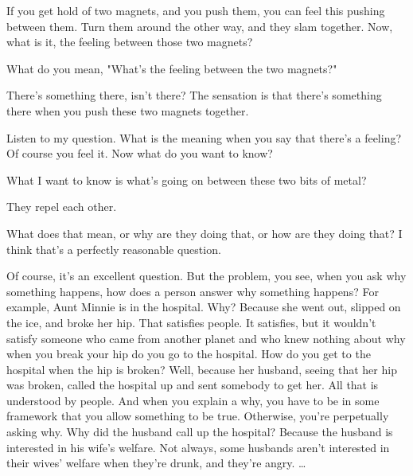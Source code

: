 \begin{description}[leftmargin=0cm, labelsep=0.5cm]
    \item[\textbf{Interviewer:}] If you get hold of two magnets, and you push them, you can feel this pushing between them. Turn them around the other way, and they slam together. Now, what is it, the feeling between those two magnets?

    \item[\textbf{Feynman:}] What do you mean, "What's the feeling between the two magnets?"

    \item[\textbf{Interviewer:}] There's something there, isn't there? The sensation is that there's something there when you push these two magnets together.

    \item[\textbf{Feynman:}] Listen to my question. What is the meaning when you say that there's a feeling? Of course you feel it. Now what do you want to know?

    \item[\textbf{Interviewer:}] What I want to know is what's going on between these two bits of metal?

    \item[\textbf{Feynman:}] They repel each other.

    \item[\textbf{Interviewer:}] What does that mean, or why are they doing that, or how are they doing that? I think that's a perfectly reasonable question.

    \item[\textbf{Feynman:}] Of course, it's an excellent question. But the problem, you see, when you ask why something happens, how does a person answer why something happens? For example, Aunt Minnie is in the hospital. Why? Because she went out, slipped on the ice, and broke her hip. That satisfies people. It satisfies, but it wouldn't satisfy someone who came from another planet and who knew nothing about why when you break your hip do you go to the hospital. How do you get to the hospital when the hip is broken? Well, because her husband, seeing that her hip was broken, called the hospital up and sent somebody to get her. All that is understood by people. And when you explain a why, you have to be in some framework that you allow something to be true. Otherwise, you're perpetually asking why. Why did the husband call up the hospital? Because the husband is interested in his wife's welfare. Not always, some husbands aren't interested in their wives' welfare when they're drunk, and they're angry.
    \ldots
\end{description}